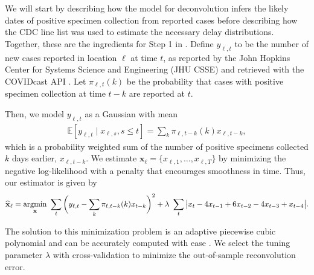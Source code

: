 \begin{linenomath*} 
We will start by describing how the model for deconvolution infers the likely
dates of positive specimen collection from reported cases before describing how
the CDC line list \citep{cdc2020caserestr} 
was used to estimate the necessary delay distributions. Together,
these are the ingredients for Step 1 in .
Define $y_{\ell,t}$ to be the number of new cases reported in location $\ell$ at
time $t$, as reported by the John Hopkins Center for Systems Science and
Engineering (JHU CSSE)\citealp{dong2020interactive} and retrieved with the
COVIDcast API \citep{reinhart2021open}. Let $\pi_{\ell,t}(k)$ be the probability
that cases with positive specimen collection at time $t-k$ are reported at $t$. 
\end{linenomath*} 
\begin{linenomath*} 
Then, we
model $y_{\ell,t}$ as a Gaussian with mean 
\begin{align}
  \mathbb{E}[y_{\ell,t} \mid x_{\ell,s}, s \leq t ] =\sum_{k} \pi_{\ell,t-k}(k)x_{\ell,t-k},
  \label{eq:cases-model}
\end{align}
which is a probability weighted sum of the number of positive specimens
collected $k$ days earlier, $x_{\ell,t-k}$.
We estimate $\mathbf{x}_\ell = \{x_{\ell,1},\ldots,x_{\ell,T}\}$ by minimizing
the negative log-likelihood with a penalty that encourages smoothness in time.
Thus, our estimator is given by
\begin{align}
  \widehat{\mathbf{x}}_\ell = \operatorname*{argmin}_{\mathbf{x}}\ \sum_{t}
  \bigg( y_{\ell,t} -  \sum_k \pi_{\ell,t-k}(k) x_{t-k} \bigg)^2 
  + \lambda\ \sum_t \big|x_t - 4x_{t-1} + 6x_{t-2} -4x_{t-3}+ x_{t-4}\big|.
  \label{eq:cases-deconvolved}
\end{align}
\end{linenomath*} 
The solution to this minimization
problem is an adaptive piecewise cubic polynomial \citep{tibshirani2014adaptive,
tibshirani2022divided} and can be accurately computed with ease
\citep{ramdas2016fast,jahja2022real}. We select the tuning parameter
$\lambda$ with cross-validation
to minimize the out-of-sample reconvolution error. 

